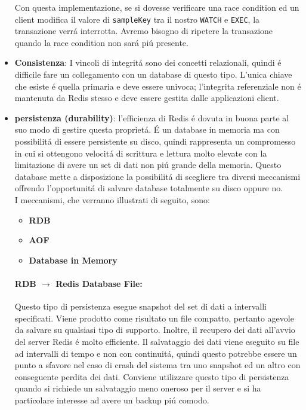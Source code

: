 \begin{itemize}
    Con questa implementazione, se si dovesse verificare una race condition ed un client modifica il valore di \texttt{sampleKey} tra il nostro
    \texttt{WATCH} e \texttt{EXEC}, la transazione verrá interrotta. Avremo bisogno di ripetere la transazione quando la race condition non sará
    piú presente.\\

    \item \textbf{Consistenza}: I vincoli di integritá sono dei concetti relazionali, quindi é difficile fare un collegamento con un database di questo tipo.
    L'unica chiave che esiste é quella primaria e deve essere univoca;
    l'integrita referenziale non é mantenuta da Redis stesso e deve essere gestita dalle applicazioni client.

    \item \textbf{persistenza (durability)}:
    l'efficienza di Redis é dovuta in buona parte al suo modo di gestire questa proprietá.
    É un database in memoria ma con possibilitá di essere persistente su disco, quindi rappresenta un compromesso in cui si ottengono
    velocitá di scrittura e lettura molto elevate con la limitazione di avere un set di dati non piú grande della memoria.
    Questo database mette a disposizione la possibilitá di scegliere tra diversi meccanismi
    offrendo l'opportunitá di salvare database
    totalmente su disco oppure no.\\
    I meccanismi, che verranno illustrati di seguito, sono:
      \begin{itemize}
          \item \textbf{RDB}
          \item \textbf{AOF}
          \item \textbf{Database in Memory}
      \end{itemize}%
        
       \paragraph{RDB $\to$ Redis Database File:}
         Questo tipo di persistenza esegue snapshot del set di dati a intervalli specificati. Viene prodotto come risultato un file
         compatto, pertanto agevole da salvare su qualsiasi tipo di supporto. Inoltre, il recupero dei dati all'avvio del server Redis
         é molto efficiente.
         Il salvataggio dei dati viene eseguito su file ad intervalli di tempo e non con continuitá, quindi questo potrebbe essere un punto a sfavore
         nel caso di crash del sistema tra uno snapshot ed un altro con conseguente perdita dei dati.
         Conviene utilizzare questo tipo di persistenza quando si richiede un salvataggio meno oneroso per il server e si ha particolare interesse
         ad avere un backup piú comodo.


\end{itemize}
